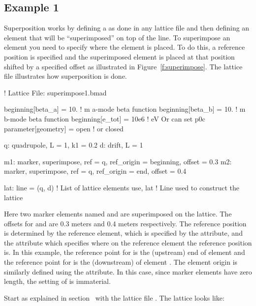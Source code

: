 \documentclass{hitec}     %
\begin{document}
\subsection{Example 1}

Superposition works by defining a  as done in any lattice file and then defining an element
that will be ``superimposed'' on top of the line. To superimpose an element you need to specify
where the element is placed. To do this, a reference position is specified and the superimposed
element is placed at that position shifted by a specified offset as illustrated in
Figure~\ref{f:superimpose}. The lattice file  illustrates how superposition is
done.
\begin{code}
! Lattice File: superimpose1.bmad

beginning[beta_a] = 10.   ! m  a-mode beta function
beginning[beta_b] = 10.   ! m  b-mode beta function
beginning[e_tot] = 10e6   ! eV   Or can set p0c
parameter[geometry] = open      ! or closed

q: quadrupole, L = 1, k1 = 0.2
d: drift, L = 1

m1: marker, superimpose, ref = q, ref_origin = beginning, offset = 0.3
m2: marker, superimpose, ref = q, ref_origin = end, offset = 0.4

lat: line = (q, d)   ! List of lattice elements
use, lat             ! Line used to construct the lattice
\end{code}
Here two marker elements named  and  are superimposed on the lattice. The offsets for
 and  are 0.3 meters and 0.4 meters respectively. The reference position is determined
by the reference element, which is specified by the  attribute, and the 
attribute which specifies where on the reference element the reference position is. In this example,
the reference point for  is the  (upstream) end of element  and the
reference point for  is the (downstream)  of element . The element origin is
similarly defined using the  attribute. In this case, since marker elements have zero
length, the setting of  is immaterial.

Start \tao as explained in section~ with the lattice file
. The lattice looks like:
\end{document}
